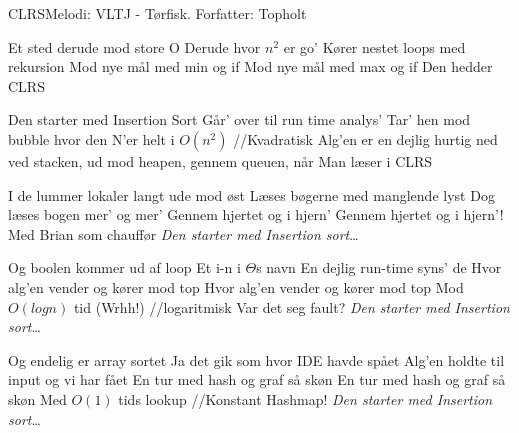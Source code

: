 \begin{sang}{CLRS}{Melodi: VLTJ - Tørfisk. Forfatter: Topholt}
    \begin{vers}
    Et sted derude mod store O
    Derude hvor $n^2$ er go'
    Kører nestet loops med rekursion
    Mod nye mål med min og if
    Mod nye mål med max og if
    Den hedder CLRS
    \end{vers}
    
    \begin{omkvaed}
    Den starter med Insertion Sort
    Går' over til run time analys'
    Tar' hen mod bubble hvor den N'er helt i $O(n^2)$ //Kvadratisk
    Alg'en er en dejlig hurtig ned ved stacken, ud mod heapen, gennem queuen, når
    Man læser i CLRS
    \end{omkvaed}
    
    \begin{vers}
    I de lummer lokaler langt ude mod øst
    Læses bøgerne med manglende lyst
    Dog læses bogen mer' og mer'
    Gennem hjertet og i hjern'
    Gennem hjertet og i hjern'!
    Med Brian som chauffør
    \emph{Den starter med Insertion sort}\ldots
    \end{vers}
    
    \begin{vers}
    Og boolen kommer ud af loop
    Et i-n i $\Theta$s navn
    En dejlig run-time syns' de
    Hvor alg'en vender og kører mod top
    Hvor alg'en vender og kører mod top
    Mod $O(log n)$ tid (Wrhh!) //logaritmisk
    Var det seg fault?
    \emph{Den starter med Insertion sort}\ldots
    \end{vers}

    \begin{vers}
    Og endelig er array sortet
    Ja det gik som hvor IDE havde spået
    Alg'en holdte til input og vi har fået
    En tur med hash og graf så skøn
    En tur med hash og graf så skøn
    Med $O(1)$ tids lookup //Konstant
    Hashmap!
    \emph{Den starter med Insertion sort}\ldots
    \end{vers} 
\end{sang}